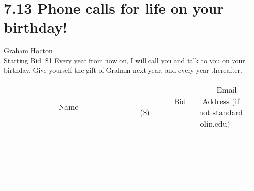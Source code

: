 \documentclass[11pt]{article}
\begin{document}
\section*{7.13 Phone calls for life on your birthday!}
Graham Hooton
\\
Starting Bid: \$1
\newline
Every year from now on, I will call you and talk to you on your birthday. Give yourself the gift of Graham next year, and every year thereafter.
\\[3ex]
\begin{tabular}{c c c}
~~~~~~~~~~~~~Name~~~~~~~~~~~~~ & ~~~~~~~~~Bid (\$)~~~~~~~~~  & ~~~Email Address (if not standard olin.edu)~~~\\
 & & \\
\hline
 & & \\
\hline
 & & \\
\hline
 & & \\
\hline
 & & \\
\hline
 & & \\
\hline
 & & \\
\hline
 & & \\
\hline
 & & \\
\hline
 & & \\
\hline
 & & \\
\hline
 & & \\
\hline
 & & \\
\hline
 & & \\
\hline
 & & \\
\hline
 & & \\
\hline
 & & \\
\hline
 & & \\
\hline
 & & \\
\hline
\end{tabular}
\newpage
\end{document}
